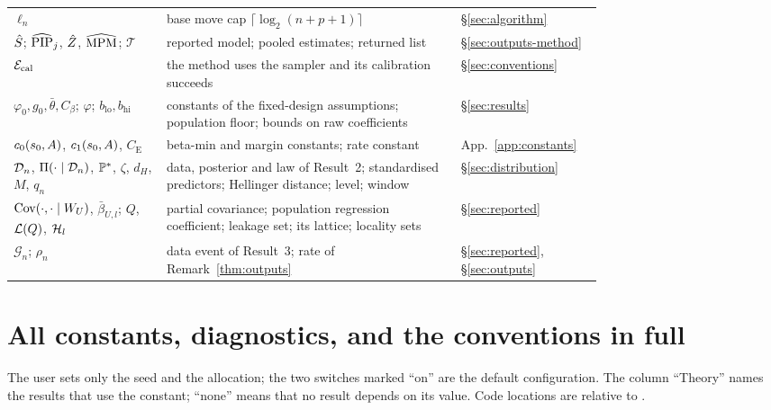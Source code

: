 {\begin{longtable}{@{}p{0.26\linewidth}p{0.5\linewidth}l@{}}
$\ell_n$ & base move cap $\lceil\log_2(n+p+1)\rceil$ & \S\ref{sec:algorithm} \\
$\Shat$; $\PIPhat_j$, $\Zhat$, $\MPMhat$; $\mathcal T$ & reported model; pooled estimates; returned list & \S\ref{sec:outputs-method} \\
$\Acal$ & the method uses the sampler and its calibration succeeds & \S\ref{sec:conventions} \\
$\varphi_0,g_0,\bar\theta,C_\beta$; $\varphi$; $b_{\mathrm{lo}},b_{\mathrm{hi}}$ & constants of the fixed-design assumptions; population floor; bounds on raw coefficients & \S\ref{sec:results} \\
$c_0(\sz,A)$, $c_1(\sz,A)$, $C_{\mathrm E}$ & beta-min and margin constants; rate constant & App.~\ref{app:constants} \\
$\Dn$, $\Pi(\cdot\mid\Dn)$, $\P^*$, $\zeta$, $d_H$, $M$, $q_n$ & data, posterior and law of Result~2; standardised predictors; Hellinger distance; level; window & \S\ref{sec:distribution} \\
$\Cov(\cdot,\cdot\mid W_U)$, $\bar\beta_{U,l}$; $Q$, $\Lat(Q)$, $\Hl_l$ & partial covariance; population regression coefficient; leakage set; its lattice; locality sets & \S\ref{sec:reported} \\
$\mathcal G_n$; $\rho_n$ & data event of Result~3; rate of Remark~\ref{thm:outputs} & \S\ref{sec:reported}, \S\ref{sec:outputs} \\
\bottomrule
\end{longtable}}

\section{All constants, diagnostics, and the conventions in full}\label{app:params}

The user sets only the seed and the allocation; the two switches marked ``on'' are the default configuration. The column
``Theory'' names the results that use the constant; ``none'' means that no result depends on its value. Code locations are
relative to .

